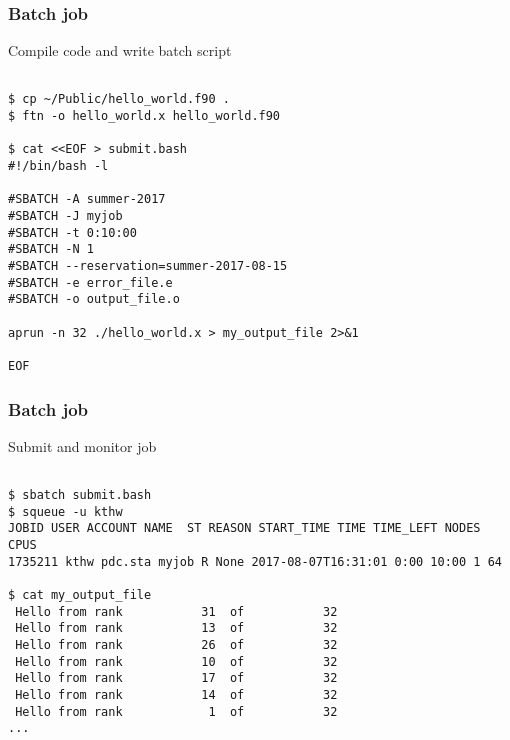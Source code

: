 \begin{frame}[fragile]
  \frametitle{Batch job}
  \begin{alertblock}{Compile code and write batch script}
    \verbatimfont{\footnotesize}
    \begin{verbatim}

$ cp ~/Public/hello_world.f90 .
$ ftn -o hello_world.x hello_world.f90

$ cat <<EOF > submit.bash
#!/bin/bash -l

#SBATCH -A summer-2017
#SBATCH -J myjob
#SBATCH -t 0:10:00
#SBATCH -N 1
#SBATCH --reservation=summer-2017-08-15
#SBATCH -e error_file.e
#SBATCH -o output_file.o

aprun -n 32 ./hello_world.x > my_output_file 2>&1

EOF

 \end{verbatim}
\end{alertblock}


\end{frame}



\begin{frame}[fragile]
  \frametitle{Batch job}
  \begin{alertblock}{Submit and monitor job}
    \verbatimfont{\footnotesize}
    \begin{verbatim}

$ sbatch submit.bash
$ squeue -u kthw
JOBID USER ACCOUNT NAME  ST REASON START_TIME TIME TIME_LEFT NODES CPUS
1735211 kthw pdc.sta myjob R None 2017-08-07T16:31:01 0:00 10:00 1 64

$ cat my_output_file
 Hello from rank           31  of           32
 Hello from rank           13  of           32
 Hello from rank           26  of           32
 Hello from rank           10  of           32
 Hello from rank           17  of           32
 Hello from rank           14  of           32
 Hello from rank            1  of           32
...


 \end{verbatim}
\end{alertblock}


\end{frame}



